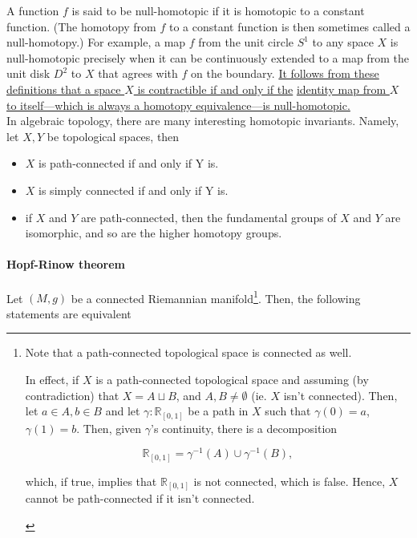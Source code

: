 \documentclass{homework}
\begin{document}
A function $f$ is said to be null-homotopic if it is homotopic to a constant function. (The homotopy from $f$ to a constant function is then sometimes called a null-homotopy.) For example, a map $f$ from the unit circle $S^1$ to any space $X$ is null-homotopic precisely when it can be continuously extended to a map from the unit disk $D^2$ to $X$ that agrees with $f$ on the boundary. \underline{It follows from these definitions that a space $X$ is contractible if and only if the}
\underline{ identity map from $X$ to itself—which is always a homotopy equivalence—is null-homotopic.} \\

In algebraic topology, there are many interesting homotopic invariants. Namely, let $X, Y$ be topological spaces, then 

\begin{itemize}
    \item $X$ is path-connected if and only if Y is.
    \item $X$ is simply connected if and only if Y is.
    \item if $X$ and $Y$ are path-connected, then the fundamental groups of $X$ and $Y$ are isomorphic, and so are the higher homotopy groups. \\
\end{itemize}

\paragraph{\textbf{Hopf-Rinow theorem}}

Let $(M,g)$ be a connected Riemannian manifold\footnote{Note that a path-connected topological space is connected as well. 
\begin{tcolorbox}[title=Proof: path-connectedness implies connectedness]
In effect, if $X$ is a path-connected topological space and assuming (by contradiction) that $X = A \sqcup B$, and $A, B \neq \emptyset$ (ie. $X$ isn't connected). Then, let $a \in A, b \in B$ and let $\gamma: \mathds{R}_{[0,1]}$ be a path in $X$ such that $\gamma(0) = a$, $\gamma(1) = b$. Then, given $\gamma$'s continuity, there is a decomposition 

$$
    \mathds{R}_{[0,1]} = \gamma^{-1}(A) \cup \gamma^{-1}(B),
$$

which, if true, implies that $\mathds{R}_{[0,1]}$ is not connected, which is false. Hence, $X$ cannot be path-connected if it isn't connected.
\end{tcolorbox}}. Then, the following statements are equivalent
\end{document}

